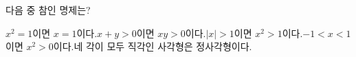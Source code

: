 다음 중 참인 명제는? 
\begin{choicesv}{$x^2=1$이면 $x=1$이다.}{$x+y>0$이면 $xy>0$이다.}{$|x|>1$이면 $x^2>1$이다.}{$-1<x<1$이면 $x^2>0$이다.}{네 각이 모두 직각인 사각형은 정사각형이다.}\end{choicesv}
